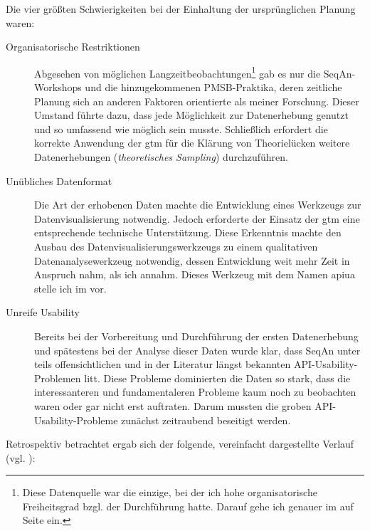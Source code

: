 \bigskip

Die vier größten Schwierigkeiten bei der Einhaltung der ursprünglichen Planung waren:
\begin{description}
  \item[Organisatorische Restriktionen] Abgesehen von möglichen Langzeitbeobachtungen\footnote{Diese Datenquelle war die einzige, bei der ich hohe organisatorische Freiheitsgrad bzgl. der Durchführung hatte. Darauf gehe ich genauer im  auf Seite \pageref{sec:phase2-programmierfortschritte-durchfuhrung} ein.} gab es nur die SeqAn-Workshops und die hinzugekommenen PMSB-Praktika, deren zeitliche Planung sich an anderen Faktoren orientierte als meiner Forschung. Dieser Umstand führte dazu, dass jede Möglichkeit zur Datenerhebung genutzt und so umfassend wie möglich sein musste. Schließlich erfordert die korrekte Anwendung der \gls{gtm} für die Klärung von Theorielücken weitere Datenerhebungen (\textit{theoretisches Sampling}) durchzuführen.
  \item[Unübliches Datenformat] Die Art der erhobenen Daten machte die Entwicklung eines Werkzeugs zur Datenvisualisierung notwendig. Jedoch erforderte der Einsatz der \gls{gtm} eine entsprechende technische Unterstützung. Diese Erkenntnis machte den Ausbau des Datenvisualisierungswerkzeugs zu einem qualitativen Datenanalysewerkzeug notwendig, dessen Entwicklung weit mehr Zeit in Anspruch nahm, als ich annahm. Dieses Werkzeug mit dem Namen \acrlong{apiua} stelle ich im  vor.
  \item[Unreife Usability] Bereits bei der Vorbereitung und Durchführung der ersten Datenerhebung und spätestens bei der Analyse dieser Daten wurde klar, dass SeqAn unter teils offensichtlichen und in der Literatur längst bekannten API-Usability-Problemen litt. Diese Probleme dominierten die Daten so stark, dass die interessanteren und fundamentaleren Probleme kaum noch zu beobachten waren oder gar nicht erst auftraten. Darum mussten die groben API-Usability-Probleme zunächst zeitraubend beseitigt werden.
\end{description}

\bigskip

Retrospektiv betrachtet ergab sich der folgende, vereinfacht dargestellte Verlauf (vgl. ):


